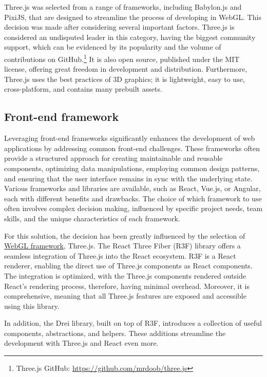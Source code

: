 Three.js was selected from a range of frameworks, including Babylon.js and PixiJS, that are designed to streamline the process of developing in WebGL. This decision was made after considering several important factors.
Three.js is considered an undisputed leader in this category, having the biggest community support, which can be evidenced by its popularity and the volume of contributions on GitHub.\footnote{Three.js GitHub: \url{https://github.com/mrdoob/three.js}} It is also open source, published under the MIT license, offering great freedom in development and distribution. Furthermore, Three.js uses the best practices of 3D graphics; it is lightweight, easy to use, cross-platform, and contains many prebuilt assets. \cite{Parisi2014} \cite{ThreeJs} \cite{BabylonJs} \cite{PixiJS}

\subsection{Front-end framework}

Leveraging front-end frameworks significantly enhances the development of web applications by addressing common front-end challenges. These frameworks often provide a structured approach for creating maintainable and reusable components, optimizing data manipulations, employing common design patterns, and ensuring that the user interface remains in sync with the underlying state. Various frameworks and libraries are available, such as React, Vue.js, or Angular, each with different benefits and drawbacks. The choice of which framework to use often involves complex decision making, influenced by specific project needs, team skills, and the unique characteristics of each framework. \cite{Gimeno2018} \cite{Pekarsky2020}

For this solution, the decision has been greatly influenced by the selection of \hyperref[section:WebGL]{WebGL framework}, Three.js. The React Three Fiber (R3F) library offers a seamless integration of Three.js into the React ecosystem. R3F is a React renderer, enabling the direct use of Three.js components as React components. The integration is optimized, with the Three.js components rendered outside React's rendering process, therefore, having minimal overhead. Moreover, it is comprehensive, meaning that all Three.js features are exposed and accessible using this library. \cite{R3F}

In addition, the Drei library, built on top of R3F, introduces a collection of useful components, abstractions, and helpers. These additions streamline the development with Three.js and React even more. \cite{Drei}

